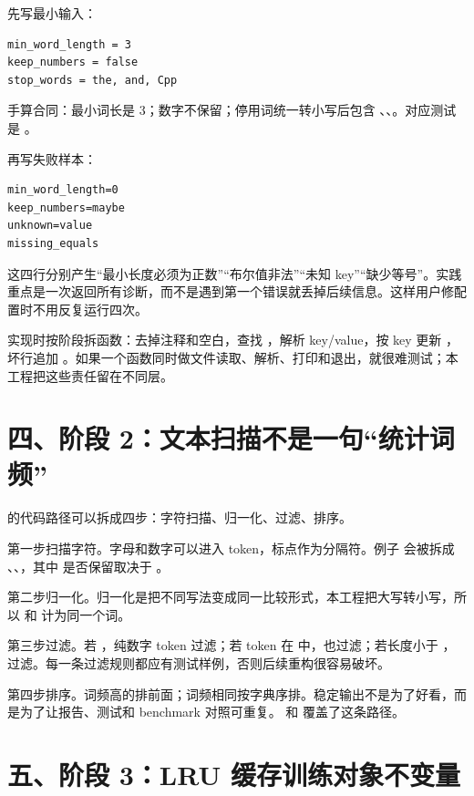 先写最小输入：

\begin{lstlisting}
min_word_length = 3
keep_numbers = false
stop_words = the, and, Cpp
\end{lstlisting}

手算合同：最小词长是 3；数字不保留；停用词统一转小写后包含 、、。对应测试是 。

再写失败样本：

\begin{lstlisting}
min_word_length=0
keep_numbers=maybe
unknown=value
missing_equals
\end{lstlisting}

这四行分别产生“最小长度必须为正数”“布尔值非法”“未知 key”“缺少等号”。实践重点是一次返回所有诊断，而不是遇到第一个错误就丢掉后续信息。这样用户修配置时不用反复运行四次。

实现时按阶段拆函数：去掉注释和空白，查找 \code{=}，解析 key/value，按 key 更新 ，坏行追加 。如果一个函数同时做文件读取、解析、打印和退出，就很难测试；本工程把这些责任留在不同层。

\section{四、阶段 2：文本扫描不是一句“统计词频”}

 的代码路径可以拆成四步：字符扫描、归一化、过滤、排序。

第一步扫描字符。字母和数字可以进入 token，标点作为分隔符。例子  会被拆成 、、，其中  是否保留取决于 。

第二步归一化。归一化是把不同写法变成同一比较形式，本工程把大写转小写，所以  和  计为同一个词。

第三步过滤。若 ，纯数字 token 过滤；若 token 在  中，也过滤；若长度小于 ，过滤。每一条过滤规则都应有测试样例，否则后续重构很容易破坏。

第四步排序。词频高的排前面；词频相同按字典序排。稳定输出不是为了好看，而是为了让报告、测试和 benchmark 对照可重复。 和  覆盖了这条路径。

\section{五、阶段 3：LRU 缓存训练对象不变量}

